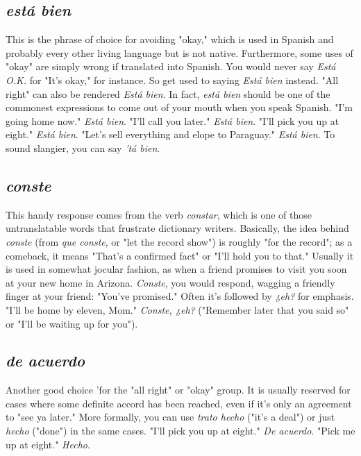 \subsection{\emph{está bien}}

This is the phrase of choice for avoiding "okay," which is used
in Spanish and probably every other living language but is not native.
Furthermore, some uses of "okay" are simply wrong if translated into
Spanish. You would never say \emph{Está O.K.} for "It's okay," for instance. So
get used to saying \emph{Está bien} instead. "All right" can also be rendered
\emph{Está bien}. In fact, \emph{está bien} should be one of the commonest expressions to come out of your mouth when you speak Spanish. "I'm going
home now." \emph{Está bien}. "I'll call you later." \emph{Está bien}. "I'll pick you up
at eight." \emph{Está bien}. "Let's sell everything and elope to Paraguay." \emph{Está
bien}. To sound slangier, you can say \emph{'tá bien}.

\subsection{\emph{conste}}

This handy response comes from the verb \emph{constar}, which is
one of those untranslatable words that frustrate dictionary writers.
Basically, the idea behind \emph{conste} (from \emph{que conste}, or "let the record
show") is roughly "for the record"; as a comeback, it means "That's a
confirmed fact" or "I'll hold you to that." Usually it is used in somewhat jocular fashion, as when a friend promises to visit you soon at
your new home in Arizona. \emph{Conste}, you would respond, wagging a
friendly finger at your friend: "You've promised." Often it's followed
by \emph{¿eh?} for emphasis. "I'll be home by eleven, Mom." \emph{Conste, ¿eh?}
("Remember later that you said so" or "I'll be waiting up for you").

\subsection{\emph{de acuerdo}}

Another good choice 'for the "all right" or "okay" group. It
is usually reserved for cases where some definite accord has been
reached, even if it's only an agreement to "see ya later." More formally,
you can use \emph{trato hecho} ("it's a deal") or just \emph{hecho} ("done") in the
same cases. "I'll pick you up at eight." \emph{De acuerdo}. "Pick me up at
eight." \emph{Hecho}.


